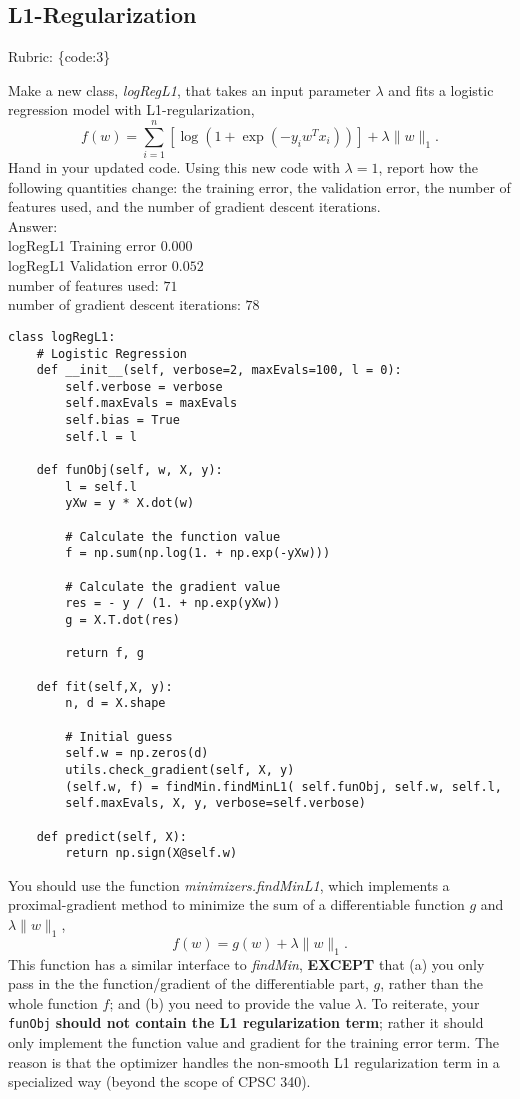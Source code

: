 \documentclass{article}
\def\rubric#1{\gre{Rubric: \{#1\}}}{}
\def\blu#1{{\color{blu}#1}}
\def\gre#1{{\color{gre}#1}}
\def\norm#1{\|#1\|}
\def\ans#1{\gre{Answer: #1}}{}
\begin{document}
\subsection{L1-Regularization}
\rubric{code:3}

Make a new class, \emph{logRegL1}, that takes an input parameter $\lambda$ and fits a logistic regression model with L1-regularization,
\[
f(w) = \sum_{i=1}^n \left[\log(1+\exp(-y_iw^Tx_i))\right] + \lambda\norm{w}_1.
\]
\blu{Hand in your updated code. Using this new code with $\lambda = 1$, report how the following quantities change: the training error, the validation error, the number of features used, and the number of gradient descent iterations.}
\\
\ans{
\\logRegL1 Training error $0.000$
\\logRegL1 Validation error $0.052$
\\number of features used: $71$
\\number of gradient descent iterations: $78$}
\begin{lstlisting}[style=base]
class logRegL1:
	# Logistic Regression
	def __init__(self, verbose=2, maxEvals=100, l = 0):
		self.verbose = verbose
		self.maxEvals = maxEvals
		self.bias = True
		self.l = l
	
	def funObj(self, w, X, y):
		l = self.l
		yXw = y * X.dot(w)
	
		# Calculate the function value
		f = np.sum(np.log(1. + np.exp(-yXw)))
		
		# Calculate the gradient value
		res = - y / (1. + np.exp(yXw))
		g = X.T.dot(res)
		
		return f, g
	
	def fit(self,X, y):
		n, d = X.shape
		
		# Initial guess
		self.w = np.zeros(d)
		utils.check_gradient(self, X, y)
		(self.w, f) = findMin.findMinL1( self.funObj, self.w, self.l,
		self.maxEvals, X, y, verbose=self.verbose)
	
	def predict(self, X):
		return np.sign(X@self.w)

\end{lstlisting}




You should use the function \emph{minimizers.findMinL1}, which implements a
proximal-gradient method to minimize the sum of a differentiable function $g$ and $\lambda\norm{w}_1$,
\[
f(w) = g(w) + \lambda \norm{w}_1.
\]
This function has a similar interface to \emph{findMin}, \textbf{EXCEPT} that (a) you
only pass in the the function/gradient of the differentiable
part, $g$, rather than the whole function $f$; and (b) you need to provide the value $\lambda$.
To reiterate, your \texttt{funObj} \textbf{should not contain the L1 regularization term}; rather it
should only implement the function value and gradient for the training error term. The reason is that 
the optimizer handles the non-smooth L1 regularization term in a specialized way (beyond the scope of CPSC 340).
\end{document}
